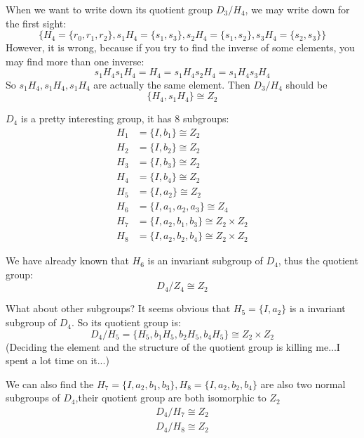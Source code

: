 \documentclass[]{ctexart}
\begin{document}
    When we want to write down its quotient group $ D_3/H_4 $, we may write down for the first sight:
    \begin{equation*}
      \{H_4=\{r_0,r_1,r_2\},s_1H_4=\{s_1,s_3\},s_2H_4=\{s_1,s_2\},s_3H_4=\{s_2,s_3\}\}
    \end{equation*}
    However, it is wrong, because if you try to find the inverse of some elements, you may find more than one inverse:
    \begin{equation*}
      s_1H_4s_1H_4=H_4=s_1H_4s_2H_4=s_1H_4s_3H_4
    \end{equation*}
    So $ s_1H_4,s_1H_4,s_1H_4 $ are actually the same element. Then $ D_3/H_4 $ should be
    \begin{equation*}
      \{H_4,s_1H_4\}\cong Z_2
    \end{equation*}
    
    $ D_4 $ is a pretty interesting group, it has 8 subgroups:
    \begin{equation*}
    \begin{aligned}
      H_1&=\{I,b_1\}\cong Z_2\\
      H_2&=\{I,b_2\}\cong Z_2\\
      H_3&=\{I,b_3\}\cong Z_2\\
      H_4&=\{I,b_4\}\cong Z_2\\
      H_5&=\{I,a_2\}\cong Z_2\\
      H_6&=\{I,a_1,a_2,a_3\}\cong Z_4\\
      H_7&=\{I,a_2,b_1,b_3\}\cong Z_2\times Z_2\\
      H_8&=\{I,a_2,b_2,b_4\}\cong Z_2\times Z_2
    \end{aligned}
    \end{equation*}
    
    We have already known that $ H_6 $ is an invariant subgroup of $ D_4 $, thus the quotient group:
    \begin{equation*}
      D_4/Z_4\cong Z_2
    \end{equation*}
    
    What about other subgroups? It seems obvious that $ H_5=\{I,a_2\} $ is a invariant subgroup of $ D_4 $. So its quotient group is:
    \begin{equation*}
      D_4/H_5=\{H_5,b_1H_5,b_2H_5,b_4H_5\}\cong Z_2\times Z_2
    \end{equation*}
    (Deciding the element and the structure of the quotient group is killing me...I spent a lot time on it...)
    
    We can also find the $ H_7=\{I,a_2,b_1,b_3\},H_8=\{I,a_2,b_2,b_4\} $ are also two normal subgroups of $ D_4 $,their quotient group are both isomorphic to $ Z_2 $
    \begin{equation*}
    \begin{aligned}
    D_4/H_7\cong Z_2\\
    D_4/H_8\cong Z_2
    \end{aligned}
    \end{equation*}
    
\end{document}

